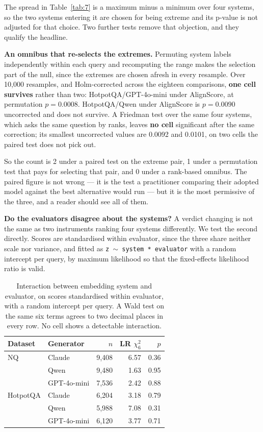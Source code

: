 \documentclass[11pt]{article}
\begin{document}
The spread in Table~\ref{tab:7} is a maximum minus a minimum over four systems, so the two systems entering it are chosen for being extreme and its p-value is not adjusted for that choice. Two further tests remove that objection, and they qualify the headline.

\textbf{An omnibus that re-selects the extremes.} Permuting system labels independently within each query and recomputing the range makes the selection part of the null, since the extremes are chosen afresh in every resample. Over 10,000 resamples, and Holm-corrected across the eighteen comparisons, \textbf{one cell survives} rather than two: HotpotQA/GPT-4o-mini under AlignScore, at permutation $p = 0.0008$. HotpotQA/Qwen under AlignScore is $p = 0.0090$ uncorrected and does not survive. A Friedman test over the same four systems, which asks the same question by ranks, leaves \textbf{no cell} significant after the same correction; its smallest uncorrected values are 0.0092 and 0.0101, on two cells the paired test does not pick out.

So the count is 2 under a paired test on the extreme pair, 1 under a permutation test that pays for selecting that pair, and 0 under a rank-based omnibus. The paired figure is not wrong --- it is the test a practitioner comparing their adopted model against the best alternative would run --- but it is the most permissive of the three, and a reader should see all of them.

\textbf{Do the evaluators disagree about the systems?} A verdict changing is not the same as two instruments ranking four systems differently. We test the second directly. Scores are standardised within evaluator, since the three share neither scale nor variance, and fitted as \texttt{z $\sim$ system * evaluator} with a random intercept per query, by maximum likelihood so that the fixed-effects likelihood ratio is valid.

\begin{table}[t]
\centering\small
\begin{tabular}{llrrr}
\toprule
\textbf{Dataset} & \textbf{Generator} & $n$ & LR $\chi^2_6$ & $p$ \\
\midrule
NQ & Claude & 9,408 & 6.57 & 0.36 \\
 & Qwen & 9,480 & 1.63 & 0.95 \\
 & GPT-4o-mini & 7,536 & 2.42 & 0.88 \\
\midrule
HotpotQA & Claude & 6,204 & 3.18 & 0.79 \\
 & Qwen & 5,988 & 7.08 & 0.31 \\
 & GPT-4o-mini & 6,120 & 3.77 & 0.71 \\
\bottomrule
\end{tabular}
\caption{Interaction between embedding system and evaluator, on scores standardised within evaluator, with a random intercept per query. A Wald test on the same six terms agrees to two decimal places in every row. No cell shows a detectable interaction.}
\label{tab:interaction}
\end{table}
\end{document}
